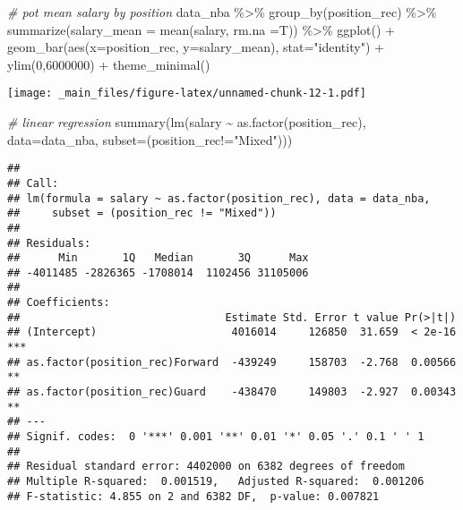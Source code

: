\documentclass[
]{book}
\newenvironment{Shaded}{\begin{snugshade}}{\end{snugshade}}
\newcommand{\AttributeTok}[1]{\textcolor[rgb]{0.77,0.63,0.00}{#1}}
\newcommand{\AttributeTok}[1]{\textcolor[rgb]{0.13,0.29,0.53}{#1}}
\newcommand{\CommentTok}[1]{\textcolor[rgb]{0.56,0.35,0.01}{\textit{#1}}}
\newcommand{\DecValTok}[1]{\textcolor[rgb]{0.00,0.00,0.81}{#1}}
\newcommand{\FunctionTok}[1]{\textcolor[rgb]{0.00,0.00,0.00}{#1}}
\newcommand{\FunctionTok}[1]{\textcolor[rgb]{0.13,0.29,0.53}{\textbf{#1}}}
\newcommand{\NormalTok}[1]{#1}
\newcommand{\SpecialCharTok}[1]{\textcolor[rgb]{0.00,0.00,0.00}{#1}}
\newcommand{\SpecialCharTok}[1]{\textcolor[rgb]{0.81,0.36,0.00}{\textbf{#1}}}
\newcommand{\StringTok}[1]{\textcolor[rgb]{0.31,0.60,0.02}{#1}}
\begin{document}
\begin{Shaded}
\begin{Highlighting}[]
\CommentTok{\# pot mean salary by position}
\NormalTok{data\_nba }\SpecialCharTok{\%\textgreater{}\%} \FunctionTok{group\_by}\NormalTok{(position\_rec) }\SpecialCharTok{\%\textgreater{}\%}
  \FunctionTok{summarize}\NormalTok{(}\AttributeTok{salary\_mean =} \FunctionTok{mean}\NormalTok{(salary, }\AttributeTok{rm.na =}\NormalTok{T)) }\SpecialCharTok{\%\textgreater{}\%}
  \FunctionTok{ggplot}\NormalTok{() }\SpecialCharTok{+}
  \FunctionTok{geom\_bar}\NormalTok{(}\FunctionTok{aes}\NormalTok{(}\AttributeTok{x=}\NormalTok{position\_rec, }\AttributeTok{y=}\NormalTok{salary\_mean), }\AttributeTok{stat=}\StringTok{"identity"}\NormalTok{) }\SpecialCharTok{+}
  \FunctionTok{ylim}\NormalTok{(}\DecValTok{0}\NormalTok{,}\DecValTok{6000000}\NormalTok{) }\SpecialCharTok{+}
  \FunctionTok{theme\_minimal}\NormalTok{()}
\end{Highlighting}
\end{Shaded}

\texttt{[image: \_main\_files/figure-latex/unnamed-chunk-12-1.pdf]}

\begin{Shaded}
\begin{Highlighting}[]
\CommentTok{\# linear regression}
\FunctionTok{summary}\NormalTok{(}\FunctionTok{lm}\NormalTok{(salary }\SpecialCharTok{\textasciitilde{}} \FunctionTok{as.factor}\NormalTok{(position\_rec), }\AttributeTok{data=}\NormalTok{data\_nba, }\AttributeTok{subset=}\NormalTok{(position\_rec}\SpecialCharTok{!=}\StringTok{"Mixed"}\NormalTok{)))}
\end{Highlighting}
\end{Shaded}

\begin{verbatim}
## 
## Call:
## lm(formula = salary ~ as.factor(position_rec), data = data_nba, 
##     subset = (position_rec != "Mixed"))
## 
## Residuals:
##      Min       1Q   Median       3Q      Max 
## -4011485 -2826365 -1708014  1102456 31105006 
## 
## Coefficients:
##                                Estimate Std. Error t value Pr(>|t|)    
## (Intercept)                     4016014     126850  31.659  < 2e-16 ***
## as.factor(position_rec)Forward  -439249     158703  -2.768  0.00566 ** 
## as.factor(position_rec)Guard    -438470     149803  -2.927  0.00343 ** 
## ---
## Signif. codes:  0 '***' 0.001 '**' 0.01 '*' 0.05 '.' 0.1 ' ' 1
## 
## Residual standard error: 4402000 on 6382 degrees of freedom
## Multiple R-squared:  0.001519,   Adjusted R-squared:  0.001206 
## F-statistic: 4.855 on 2 and 6382 DF,  p-value: 0.007821
\end{verbatim}
\end{document}
